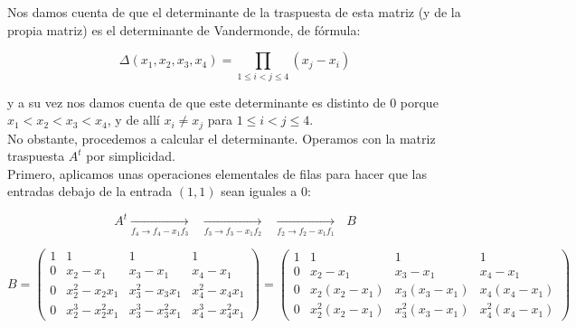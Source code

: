 \begin{itemize}[$\bullet$]
    Nos damos cuenta de que el determinante de la traspuesta de esta matriz (y de la propia matriz) es el determinante de Vandermonde, de fórmula:

    \begin{equation*}
        \Delta(x_1, x_2, x_3, x_4) = \prod\limits_{1\leq i < j \leq 4} (x_j - x_i)
    \end{equation*}

    y a su vez nos damos cuenta de que este determinante es distinto de $0$ porque $x_1 < x_2 < x_3 < x_4$, y de allí $x_i \neq x_j$ para $1\leq i < j \leq 4$.\\

    No obstante, procedemos a calcular el determinante. Operamos con la matriz traspuesta $A^t$ por simplicidad.\\

    Primero, aplicamos unas operaciones elementales de filas para hacer que las entradas debajo de la entrada $(1, 1)$ sean iguales a 0:

    \begin{equation*}
        A^t
        \xrightarrow[f_4 \longrightarrow f_4 - x_1 f_3]{}\hspace{8pt}
        \xrightarrow[f_3 \longrightarrow f_3 - x_1 f_2]{}\hspace{8pt}
        \xrightarrow[f_2 \longrightarrow f_2 - x_1 f_1]{}\hspace{8pt}
        B
    \end{equation*}

    \begin{equation*}
        B
        =
        \begin{pmatrix}
            1 & 1                 & 1                 & 1     \\[6pt]
            0 & x_2 - x_1         & x_3 - x_1         & x_4 - x_1   \\[6pt]
            0 & x_2^2 - x_2 x_1   & x_3^2 - x_3 x_1   & x_4^2 - x_4 x_1 \\[6pt]
            0 & x_2^3 - x_2^2 x_1 & x_3^3 - x_3^2 x_1 & x_4^3 - x_4^2 x_1
        \end{pmatrix}
        =
        \begin{pmatrix}
            1 & 1                & 1                 & 1     \\[6pt]
            0 & x_2 - x_1        & x_3 - x_1         & x_4 - x_1   \\[6pt]
            0 & x_2 (x_2 - x_1)  & x_3 (x_3 - x_1)   & x_4 (x_4 - x_1 ) \\[6pt]
            0 & x_2^2  (x_2 - x_1) & x_3^2 (x_3 - x_1) & x_4^2 (x_4 - x_1 )
        \end{pmatrix}
    \end{equation*}\\


\end{itemize}
